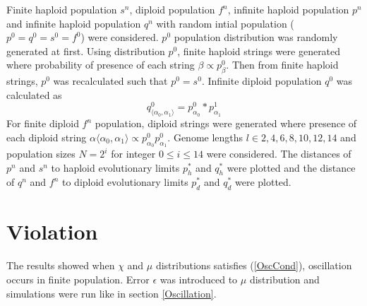 Finite haploid population $s^n$, diploid population $f^n$, infinite haploid population $p^n$ and infinite haploid population $q^n$ with random intial population ($p^0 = q^0 = s^0 = f^0 $) were considered. $p^0$ population distribution was randomly generated at first. Using distribution $p^0$, finite haploid strings were generated where probability of presence of each string $\beta \propto p^0_\beta$. Then from finite haploid strings, $p^0$ was recalculated such that $p^0 = s^0$. Infinite diploid population $q^0$ was calculated as
\[
q^0_{\langle \alpha_0, \alpha_1 \rangle} = p^0_{\alpha_0} * p^1_{\alpha_1}
\]
For finite diploid $f^n$ population, diploid strings were generated where presence of each diploid string $\alpha \langle \alpha_0, \alpha_1 \rangle \propto p^0_{\alpha_0} p^0_{\alpha_1}$.
Genome lengths $l \in {2, 4, 6, 8, 10, 12, 14}$ and population sizes $N = 2^i$ for integer $0 \leq i \leq 14$ were considered. The distances of $p^n$ and $s^n$ to haploid evolutionary limits $p_h^{\ast}$ and $q_h^{\ast}$ were plotted and the distance of $q^n$ and $f^n$ to diploid evolutionary limits $p_d^{\ast}$ and $q_d^{\ast}$ were plotted.


\section{Violation}
The results showed when $\chi$ and $\mu$ distributions satisfies (\ref{OscCond}), oscillation occurs in finite population. Error $\epsilon$ was introduced to $\mu$ distribution and simulations were run like in section \ref{Oscillation}.





 

